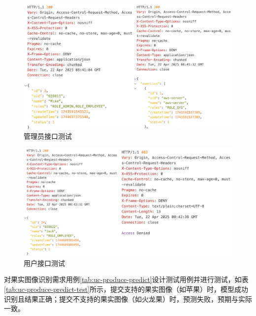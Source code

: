 \begin{figure}
    \centering
    \includegraphics[width=0.9\linewidth]{../result/rest-test-user-auth-admin.png}
    \caption{管理员接口测试}
    \label{fig:rest-test-user-auth-admin}
\end{figure}

\begin{figure}
    \centering
    \includegraphics[width=0.9\linewidth]{../result/rest-test-user-auth-emp.png}
    \caption{用户接口测试}
    \label{fig:rest-test-user-auth-emp}
\end{figure}

对果实图像识别需求用例\ref{tab:uc-produce-predict}设计测试用例并进行测试，如表\ref{tab:uc-produce-predict-test}所示，提交支持的果实图像（如苹果）时，模型成功识别且结果正确；提交不支持的果实图像（如火龙果）时，预测失败，预期与实际一致。

